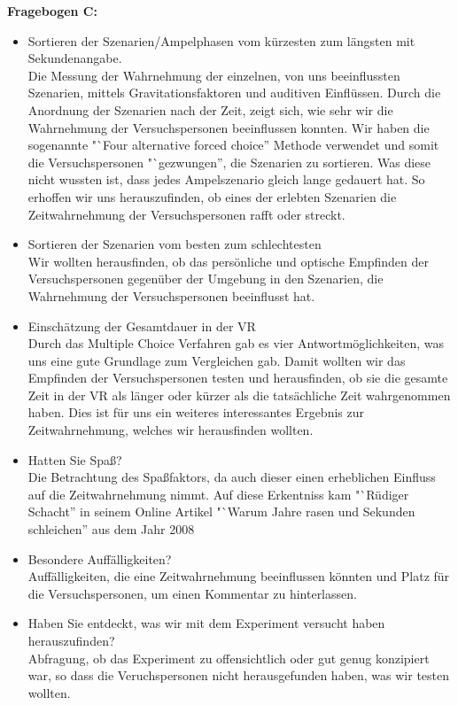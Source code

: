 \documentclass{Bericht}
\begin{document}
 

\textbf{Fragebogen C:}
\begin{itemize}
	\setlength{\itemsep}{0em}
	\item Sortieren der Szenarien/Ampelphasen vom kürzesten zum längsten mit Sekundenangabe. \\
Die Messung der Wahrnehmung der einzelnen, von uns beeinflussten Szenarien, mittels Gravitationsfaktoren und auditiven Einflüssen. Durch die Anordnung der Szenarien nach der Zeit, zeigt sich, wie sehr wir die Wahrnehmung der Versuchspersonen beeinflussen konnten.  Wir haben die sogenannte "`Four alternative forced choice'' Methode verwendet und somit die Versuchspersonen "`gezwungen'', die Szenarien zu sortieren. Was diese nicht wussten ist, dass jedes Ampelszenario gleich lange gedauert hat. So erhoffen wir uns herauszufinden, ob eines der erlebten Szenarien die Zeitwahrnehmung der Versuchspersonen rafft oder streckt.
	\item Sortieren der Szenarien vom besten zum schlechtesten\\
Wir wollten herausfinden, ob das persönliche und optische Empfinden der Versuchspersonen gegenüber der Umgebung in den Szenarien, die Wahrnehmung der Versuchspersonen beeinflusst hat.
	\item Einschätzung der Gesamtdauer in der VR\\
Durch das Multiple Choice Verfahren gab es vier Antwortmöglichkeiten, was uns eine gute Grundlage zum Vergleichen gab. Damit wollten wir das Empfinden der Versuchspersonen testen und herausfinden, ob sie die gesamte Zeit in der VR als länger oder kürzer als die tatsächliche Zeit wahrgenommen haben. Dies ist für uns ein weiteres interessantes Ergebnis zur Zeitwahrnehmung, welches wir herausfinden wollten.
	\item Hatten Sie Spaß?\\
Die Betrachtung des Spaßfaktors,  da auch dieser einen erheblichen Einfluss auf die Zeitwahrnehmung nimmt. Auf diese Erkentniss kam "`Rüdiger Schacht'' in seinem Online Artikel "`Warum Jahre rasen und Sekunden schleichen'' aus dem Jahr 2008 \cite{Spass}
	\item Besondere Auffälligkeiten?\\
Auffälligkeiten, die eine Zeitwahrnehmung beeinflussen könnten und Platz für die Versuchspersonen, um einen Kommentar zu hinterlassen.
	\item Haben Sie entdeckt, was wir mit dem Experiment versucht haben herauszufinden?\\
Abfragung, ob das Experiment zu offensichtlich oder gut genug konzipiert war, so dass die Veruchspersonen nicht herausgefunden haben, was wir testen wollten. 
\end{itemize}
\end{document}
